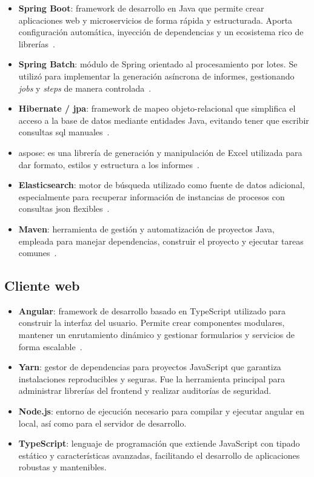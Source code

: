 \documentclass[11pt,a4paper,titlepage,oneside]{report}
\begin{document}
\begin{itemize}
    \item \textbf{Spring Boot}: framework de desarrollo en Java que permite crear aplicaciones web y microservicios de forma rápida y estructurada. Aporta configuración automática, inyección de dependencias y un ecosistema rico de librerías~\cite{SpringBootDocs}.
    \item \textbf{Spring Batch}: módulo de Spring orientado al procesamiento por lotes. Se utilizó para implementar la generación asíncrona de informes, gestionando \textit{jobs} y \textit{steps} de manera controlada~\cite{SpringBatchDocs}.
    \item \textbf{Hibernate / \acrshort{jpa}}: framework de mapeo objeto-relacional que simplifica el acceso a la base de datos mediante entidades Java, evitando tener que escribir consultas \acrshort{sql} manuales~\cite{HibernateDocs}.
    \item \gls{aspose}: es una librería de generación y manipulación de Excel utilizada para dar formato, estilos y estructura a los informes~\cite{AsposeCellsDocs}.
    \item \textbf{Elasticsearch}: motor de búsqueda utilizado como fuente de datos adicional, especialmente para recuperar información de instancias de procesos con consultas \acrshort{json} flexibles~\cite{ElasticsearchDocs}.
    \item \textbf{Maven}: herramienta de gestión y automatización de proyectos Java, empleada para manejar dependencias, construir el proyecto y ejecutar tareas comunes~\cite{MavenDocs}.
\end{itemize}

\subsection{Cliente web}

\begin{itemize}
    \item \textbf{Angular}: framework de desarrollo basado en TypeScript utilizado para construir la interfaz del usuario. Permite crear componentes modulares, mantener un enrutamiento dinámico y gestionar formularios y servicios de forma escalable~\cite{AngularDocs}.
    \item \textbf{Yarn}: gestor de dependencias para proyectos JavaScript que garantiza instalaciones reproducibles y seguras. Fue la herramienta principal para administrar librerías del frontend y realizar auditorías de seguridad.
    \item \textbf{Node.js}: entorno de ejecución necesario para compilar y ejecutar \gls{angular} en local, así como para el servidor de desarrollo.
    \item \textbf{TypeScript}: lenguaje de programación que extiende JavaScript con tipado estático y características avanzadas, facilitando el desarrollo de aplicaciones robustas y mantenibles.
\end{itemize}
\end{document}
